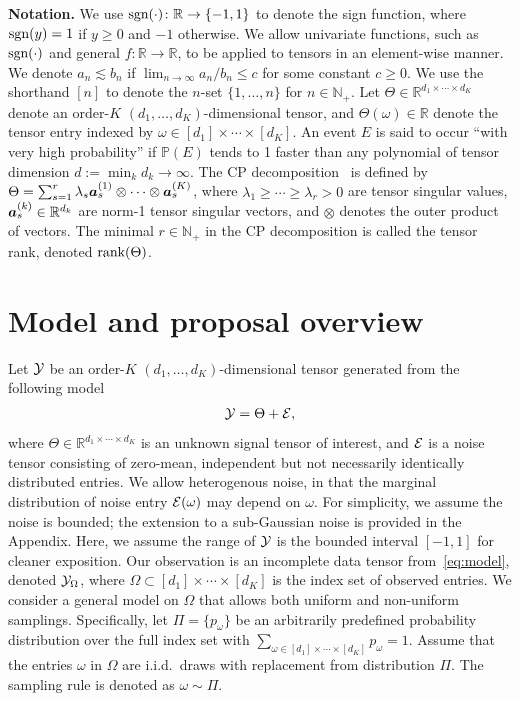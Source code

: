 \documentclass{article}
\theoremstyle{plain}
\theoremstyle{definition}
\def\sign{\textup{sgn}}
\def\rank{\textup{rank}}
\begin{document}
{\bf Notation.} We use $\sign(\cdot)\colon \mathbb{R}\to\{-1,1\}$ to denote the sign function, where $\sign(y)=1$ if $y\geq 0$ and $-1$ otherwise. We allow univariate functions, such as $\sign(\cdot)$ and general $f\colon \mathbb{R}\to\mathbb{R}$, to be applied to tensors in an element-wise manner. 
We denote $a_n\lesssim b_n$ if $\lim_{n\to \infty} a_n/b_n\leq c$ for some constant $c\geq0$.  We use the shorthand $[n]$ to denote the $n$-set $\{1,\ldots,n\}$ for $n\in\mathbb{N}_{+}$. Let $\Theta\in\mathbb{R}^{d_1\times \cdots \times d_K}$ denote an order-$K$ $(d_1,\ldots,d_K)$-dimensional tensor, and $\Theta(\omega)\in\mathbb{R}$ denote the tensor entry indexed by $\omega \in[d_1]\times \cdots \times [d_K]$. An event $E$ is said to occur ``with very high probability'' if $\mathbb{P}(E)$ tends to 1 faster than any polynomial of tensor dimension $d:=\min_k d_k \to\infty$. The CP decomposition~\citep{hitchcock1927expression} is defined by $\Theta=\sum_{s=1}^r\lambda_s \bm{a}^{(1)}_s\otimes\cdots\otimes \bm{a}^{(K)}_s$,
where $\lambda_1\geq \cdots \geq \lambda_r>0$ are tensor singular values, $\bm{a}^{(k)}_s\in\mathbb{R}^{d_k}$ are norm-1 tensor singular vectors, and $\otimes$ denotes the outer product of vectors. The minimal $r\in\mathbb{N}_{+}$ in the CP decomposition is called the tensor rank, denoted $\rank(\Theta)$.  

\vspace{-.2cm}
\section{Model and proposal overview}\label{sec:overview}
Let $\mathcal{Y}$ be an order-$K$ $(d_1,\ldots,d_K)$-dimensional  tensor generated from the following model
\begin{equation}\label{eq:model}
\mathcal{Y}=\Theta+\mathcal{E},
\end{equation}
where $\Theta\in\mathbb{R}^{d_1\times \cdots \times d_K}$ is an unknown signal tensor of interest, and $\mathcal{E}$ is a noise tensor consisting of zero-mean, independent but not necessarily identically distributed entries. We allow heterogenous noise, in that the marginal distribution of noise entry $\mathcal{E}(\omega)$ may depend on $\omega$.
For simplicity, we assume the noise is bounded; the extension to a sub-Gaussian noise is provided in the Appendix.  Here,  we assume the range of $\mathcal{Y}$ is the bounded interval $[-1,1]$ for cleaner exposition. Our observation is an incomplete data tensor from~\eqref{eq:model}, denoted  $\mathcal{Y}_\Omega$, where $\Omega\subset[d_1]\times\cdots\times[d_K]$ is the index set of observed entries. We consider a general model on $\Omega$ that allows both uniform and non-uniform samplings. Specifically, let $\Pi=\{p_\omega\}$ be an arbitrarily predefined probability distribution over the full index set with $\sum_{\omega\in[d_1]\times \cdots \times [d_K]}p_\omega=1$. Assume that the entries $\omega$ in $\Omega$ are i.i.d.\ draws with replacement from distribution $\Pi$. The sampling rule is denoted as $\omega\sim \Pi$. 
\end{document}

